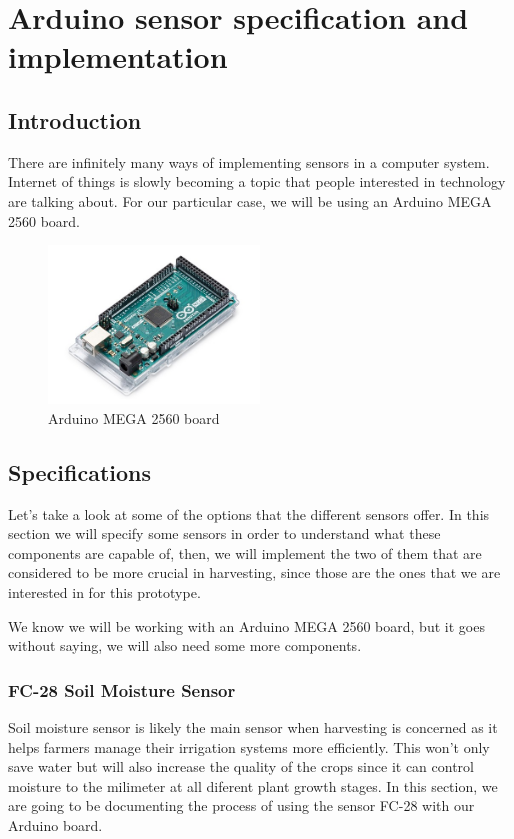 \chapter{Arduino sensor specification and implementation}\label{cap:implementacion}

\section{Introduction}
There are infinitely many ways of implementing sensors in a computer system. Internet of things is slowly becoming a topic that people interested in technology are talking about. For our particular case, we will be using an Arduino MEGA 2560 board.

\begin{figure}[H]
    \centering
    \includegraphics[width=0.5\textwidth]{fig/mega2560.jpg}
    \caption{Arduino MEGA 2560 board}
    \label{fig:mega2560}
\end{figure}



\section{Specifications}
Let's take a look at some of the options that the different sensors offer. In this section we will specify some sensors in order to understand what these components are capable of, then, we will implement the two of them that are considered to be more crucial in harvesting, since those are the ones that we are interested in for this prototype. 

We know we will be working with an Arduino MEGA 2560 board, but it goes without saying, we will also need some more components. 

\subsection{FC-28 Soil Moisture Sensor}
Soil moisture sensor is likely the main sensor when harvesting is concerned as it helps farmers manage their irrigation systems more efficiently. This won't only save water but will also increase the quality of the crops since it can control moisture to the milimeter at all diferent plant growth stages. In this section, we are going to be documenting the process of using the sensor FC-28 with our Arduino board.

